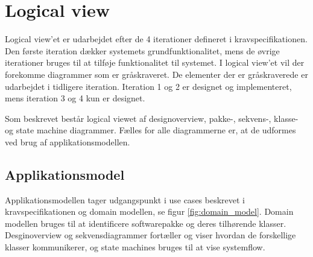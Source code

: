 \section{Logical view}
\vspace{-0.4cm}
Logical view'et er udarbejdet efter de 4 iterationer defineret i kravspecifikationen. Den første iteration dækker systemets grundfunktionalitet, mens de øvrige iterationer bruges til at tilføje funktionalitet til systemet. 
I logical view'et vil der forekomme diagrammer som er gråskraveret. De elementer der er gråskraverede er udarbejdet i tidligere iteration. Iteration 1 og 2 er designet og implementeret, mens iteration 3 og 4 kun er designet.
  
Som beskrevet består logical viewet af designoverview, pakke-, sekvens-, klasse- og state machine diagrammer. Fælles for alle diagrammerne er, at de udformes ved brug af applikationsmodellen.

\subsection{Applikationsmodel}
\vspace{-0.4cm}
Applikationsmodellen tager udgangspunkt i use cases beskrevet i kravspecifikationen og domain modellen, se figur \ref{fig:domain_model}. Domain modellen bruges til at identificere softwarepakke og deres tilhørende klasser. Desginoverview og sekvensdiagrammer fortæller og viser hvordan de forskellige klasser kommunikerer, og state machines bruges til at vise systemflow.


%

\newpage


%

%
